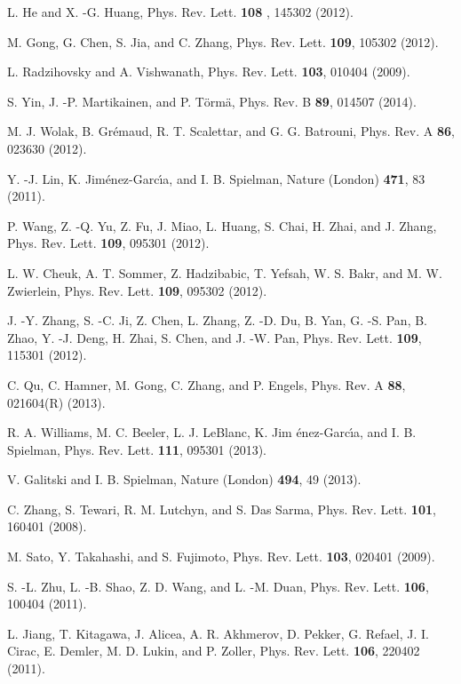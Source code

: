 \documentclass[prl,aps,twocolumn,showpacs, floatfix]{revtex4}
\begin{document}
\begin{thebibliography}{99}
 {L. He and X. -G. Huang, Phys. Rev. Lett. \textbf{108}%
, 145302 (2012).}

 {M. Gong, G. Chen, S. Jia, and C. Zhang, Phys. Rev.
Lett. \textbf{109}, 105302 (2012).}

 {L. Radzihovsky and A. Vishwanath, Phys. Rev.
Lett. \textbf{103}, 010404 (2009).}

 {S. Yin, J. -P. Martikainen, and P. T\"{o}rm\"{a},
Phys. Rev. B \textbf{89}, 014507 (2014).}

 {M. J. Wolak, B. Gr\'emaud, R. T. Scalettar, and G.
G. Batrouni, Phys. Rev. A \textbf{86}, 023630 (2012).}

 {Y. -J. Lin, K. Jim\'{e}nez-Garc\'{\i}a, and I. B.
Spielman, Nature (London) \textbf{471}, 83 (2011).}

 {P. Wang, Z. -Q. Yu, Z. Fu, J. Miao, L. Huang, S.
Chai, H. Zhai, and J. Zhang, Phys. Rev. Lett. \textbf{109}, 095301 (2012).}

 {L. W. Cheuk, A. T. Sommer, Z. Hadzibabic, T.
Yefsah, W. S. Bakr, and M. W. Zwierlein, Phys. Rev. Lett. \textbf{109},
095302 (2012).}

 {J. -Y. Zhang, S. -C. Ji, Z. Chen, L. Zhang, Z. -D.
Du, B. Yan, G. -S. Pan, B. Zhao, Y. -J. Deng, H. Zhai, S. Chen, and J. -W.
Pan, Phys. Rev. Lett. \textbf{109}, 115301 (2012).}

 C. Qu, C. Hamner, M. Gong, C. Zhang, and P. Engels,
Phys. Rev. A \textbf{88}, 021604(R) (2013).

 {R. A. Williams, M. C. Beeler, L. J. LeBlanc, K. Jim%
\'{e}nez-Garc\'{\i}a, and I. B. Spielman, Phys. Rev. Lett. \textbf{111},
095301 (2013).}

 {V. Galitski and I. B. Spielman, Nature (London)
\textbf{494}, 49 (2013).}

 {C. Zhang, S. Tewari, R. M. Lutchyn, and S. Das
Sarma, Phys. Rev. Lett. \textbf{101}, 160401 (2008).}

 {M. Sato, Y. Takahashi, and S. Fujimoto, Phys. Rev.
Lett. \textbf{103}, 020401 (2009).}

 {S. -L. Zhu, L. -B. Shao, Z. D. Wang, and L. -M.
Duan, Phys. Rev. Lett. \textbf{106}, 100404 (2011).}

 {L. Jiang, T. Kitagawa, J. Alicea, A. R. Akhmerov,
D. Pekker, G. Refael, J. I. Cirac, E. Demler, M. D. Lukin, and P. Zoller,
Phys. Rev. Lett. \textbf{106}, 220402 (2011).}


\end{thebibliography}
\end{document}
